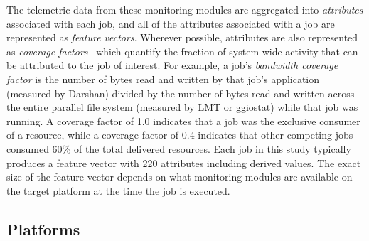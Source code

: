 The telemetric data from these monitoring modules are aggregated into \emph{attributes} associated with each job, and all of the attributes associated with a job are represented as \emph{feature vectors}.
Wherever possible, attributes are also represented as \emph{coverage factors}~\cite{Lockwood2017} which quantify the fraction of system-wide activity that can be attributed to the job of interest.
For example, a job's \emph{bandwidth coverage factor} is the number of bytes read and written by that job's application (measured by Darshan) divided by the number of bytes read and written across the entire parallel file system (measured by LMT or ggiostat) while that job was running.
A coverage factor of 1.0 indicates that a job was the exclusive consumer of
a resource, while a coverage factor of 0.4 indicates that other competing
jobs consumed 60\% of the total delivered resources.  Each job in this study
typically produces a feature vector with 220 attributes including derived
values.  The exact size of the feature vector depends on what monitoring
modules are available on the target platform at the time the job is
executed.

\subsection{Platforms}\label{sec:methods/platforms}

